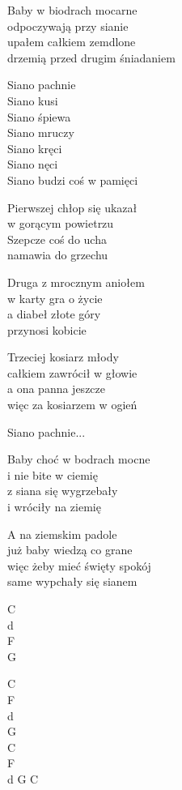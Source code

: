 \begin{text}
    Baby w biodrach mocarne\\
    odpoczywają przy sianie\\
    upałem całkiem zemdlone\\
    drzemią przed drugim śniadaniem

    \vin Siano pachnie\\
    \vin Siano kusi\\
    \vin Siano śpiewa\\
    \vin Siano mruczy\\
    \vin Siano kręci\\
    \vin Siano nęci\\
    \vin Siano budzi coś w pamięci

    Pierwszej chłop się ukazał\\
    w gorącym powietrzu\\
    Szepcze coś do ucha\\
    namawia do grzechu

    Druga z mrocznym aniołem\\
    w karty gra o życie\\
    a diabeł złote góry\\
    przynosi kobicie

    Trzeciej kosiarz młody\\
    całkiem zawrócił w głowie\\
    a ona panna jeszcze\\
    więc za kosiarzem w ogień

    \vin Siano pachnie...

    Baby choć w bodrach mocne\\
    i nie bite w ciemię\\
    z siana się wygrzebały\\
    i wróciły na ziemię

    A na ziemskim padole\\
    już baby wiedzą co grane\\
    więc żeby mieć święty spokój\\
    same wypchały się sianem
\end{text}
\begin{chord}
    C\\
    d\\
    F\\
    G

    C\\
    F\\
    d\\
    G\\
    C\\
    F\\
    d G C
\end{chord}